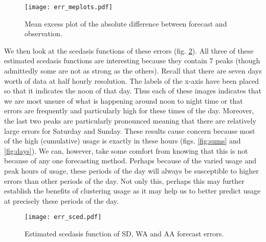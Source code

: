 \begin{figure}
\centering
\texttt{[image: err\_meplots.pdf]}
\caption{\label{fig:err_me} Mean excess plot of the absolute difference between forecast and observation.}
\end{figure}


We then look at the scedasis functions of these errors (fig. \ref{fig:err_sced}). All three of these estimated scedasis functions are interesting because they contain 7 peaks (though admittedly some are not as strong as the others). Recall that there are seven days worth of data at half hourly resolution. The labels of the x-axis have been placed so that it indicates the noon of that day. Thus each of these images indicates that we are most unsure of what is happening around noon to night time or that errors are frequently and particularly high for these times of the day. Moreover, the last two peaks are particularly pronounced meaning that there are relatively large errors for Saturday and Sunday. These results cause concern because most of the high (cumulative) usage is exactly in these hours (figs. \ref{fig:sums} and \ref{fig:days}). We can, however, take some comfort from knowing that this is not because of any one forecasting method. Perhaps because of the varied usage and peak hours of usage, these periods of the day will always be susceptible to higher errors than other periods of the day. Not only this, perhaps this may further establish the benefits of clustering usage as it may help us to better predict usage at precisely these periods of the day.

%
%

\begin{figure}
\centering
\texttt{[image: err\_sced.pdf]}
\caption{\label{fig:err_sced} Estimated scedasis function of SD, WA and AA forecast errors.}
\end{figure}

